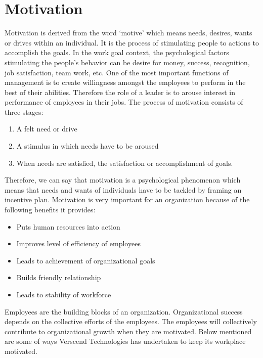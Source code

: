 \section{Motivation}
Motivation is derived from the word ‘motive’ which means needs, desires, wants or drives within an
individual. It is the process of stimulating people to actions to accomplish the goals. In the work goal context,
the psychological factors stimulating the people’s behavior can be desire for money, success, recognition, job
satisfaction, team work, etc. One of the most important functions of management is to create willingness
amongst the employees to perform in the best of their abilities. Therefore the role of a leader is to arouse
interest in performance of employees in their jobs. The process of motivation consists of three stages:
\begin{enumerate}
\item A felt need or drive
\item A stimulus in which needs have to be aroused
\item When needs are satisfied, the satisfaction or accomplishment of goals.
\end{enumerate}
Therefore, we can say that motivation is a psychological phenomenon which means that needs and wants of
individuals have to be tackled by framing an incentive plan.
Motivation is very important for an organization because of the following benefits it provides:
\begin{itemize}
\item Puts human resources into action
\item Improves level of efficiency of employees
\item Leads to achievement of organizational goals
\item Builds friendly relationship
\item Leads to stability of workforce
\end{itemize}
Employees are the building blocks of an organization. Organizational success depends on the collective efforts
of the employees. The employees will collectively contribute to organizational growth when they are
motivated. Below mentioned are some of ways Verscend Technologies has undertaken to keep its
workplace motivated.
